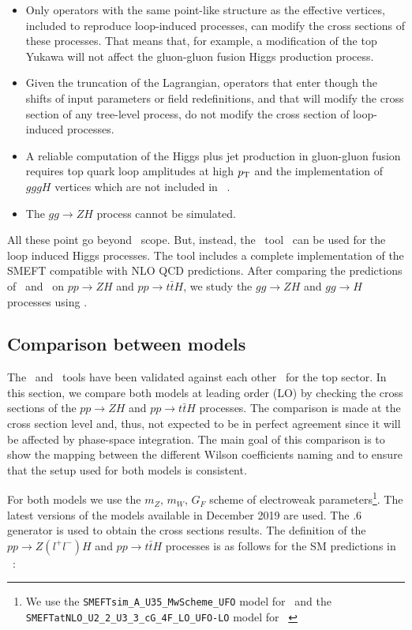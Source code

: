 \begin{itemize}
\item Only operators with the same point-like structure as the effective vertices, included to reproduce loop-induced processes, can modify the cross sections of these processes. That means that, for example, a modification of the top Yukawa will not affect the gluon-gluon fusion Higgs production process.
\item Given the truncation of the Lagrangian, operators that enter though the shifts of input parameters or field redefinitions, and that will modify the cross section of any tree-level process, do not modify the cross section of loop-induced processes.
\item A reliable computation of the Higgs plus jet  production in gluon-gluon fusion requires top quark loop amplitudes at high $p_{\textrm T}$ and the implementation of $gggH$ vertices which are not included in \SMEFTsim\ .
\item The $gg\to ZH$ process cannot be simulated.
\end{itemize}

All these point go beyond \SMEFTsim\ scope. But, instead, the \SMEFTatNLO\ tool~\cite{SMEFTNLO} can be used for the loop induced Higgs processes. The tool includes a complete implementation of the SMEFT compatible with NLO QCD predictions. After comparing the predictions of \SMEFTsim\ and \SMEFTatNLO\ on $pp\to ZH$ and $pp\to t\bar{t}H$, we study the $gg\to ZH$ and $gg\to H$ processes using \SMEFTatNLO. 


\subsection{Comparison between models}
\label{sec:higgseft:section2}
The \SMEFTsim\ and \SMEFTatNLO\ tools have been validated against each other~\cite{Durieux:2019lnv} for the top sector. In this section, we compare both models at leading order (LO) by checking the cross sections of the $pp\to ZH$ and $pp\to t\bar{t}H$ processes. The comparison is made at the cross section level and, thus, not expected to be in perfect agreement since it will be affected by phase-space integration. The main goal of this comparison is to show the mapping between the different Wilson coefficients naming and to ensure that the setup used for both models is consistent.

For both models we use the $m_Z$, $m_W$, $G_F$ scheme of electroweak parameters\footnote{We use the \texttt{SMEFTsim\_A\_U35\_MwScheme\_UFO} model for \SMEFTsim\ and the \texttt{SMEFTatNLO\_U2\_2\_U3\_3\_cG\_4F\_LO\_UFO-LO} model for \SMEFTatNLO\ }. The latest versions of the models available in December 2019 are used.  The .6 generator is used to obtain the cross sections results. The definition of the $pp\to Z(l^{+}l^{-})H$  and $pp\to t\bar{t}H$  processes is as follows for the SM predictions in \SMEFTsim\ :

